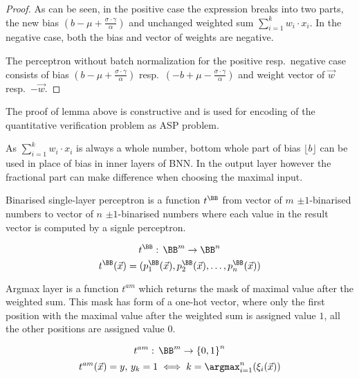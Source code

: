 \begin{lemma}
\begin{proof}
As can be seen, in the positive case the expression breaks into two parts, the new bias
$(b-\mu+\frac{\sigma\cdot \gamma}{\alpha})$
and unchanged weighted sum $\sum_{i=1}^k w_i\cdot x_i$.
In the negative case, both the bias and vector of weights are negative.

The perceptron without batch normalization for the positive resp.\ negative case
consists of bias $(b-\mu+\frac{\sigma\cdot \gamma}{\alpha})$
resp.\ $(-b+\mu-\frac{\sigma\cdot \gamma}{\alpha})$
and weight vector of $\vec w$ resp.\ $-\vec w$.
\end{proof}
\end{lemma}

\begin{remark}
The proof of lemma above is constructive and is used for encoding
of the quantitative verification problem as ASP problem.
\end{remark}

\begin{remark}
As $\sum_{i=1}^k w_i\cdot x_i$ is always a whole number, bottom whole part of bias
$\lfloor b \rfloor$ can be used in place of bias in inner layers of BNN.\@
In the output layer however the fractional part can make difference when choosing the
maximal input.
\end{remark}

\begin{definition}
Binarised single-layer perceptron is a function $t^\BB$ from vector of $m$ $\pm 1$-binarised numbers
to vector of $n$ $\pm 1$-binarised numbers where each value in the result vector is computed
by a signle perceptron.

\begin{equation*}
    t^\BB: \, \BB^{m} \to \BB^{n}
\end{equation*}
\begin{equation*}
    t^\BB(\vec x) = (p^\BB_{1}(\vec x), p^\BB_{2}(\vec x), \ldots, p^\BB_{n}(\vec x))
\end{equation*}
\end{definition}

\begin{definition}\label{def:argmax}
Argmax layer is a function $t^{am}$ which returns the mask of maximal value after
the weighted sum. This mask has form of a one-hot vector, where only the first
position with the maximal value after the weighted sum is assigned value $1$,
all the other positions are assigned value $0$.

\begin{equation*}
	t^{am}: \, \BB^{m} \to {\{0,1\}}^{n}
\end{equation*}
\begin{equation*}
	t^{am}(\vec x) = y,\, y_k = 1 \iff k = \argmax_{i=1}^n(\xi_i(\vec x))
\end{equation*}
\end{definition}

